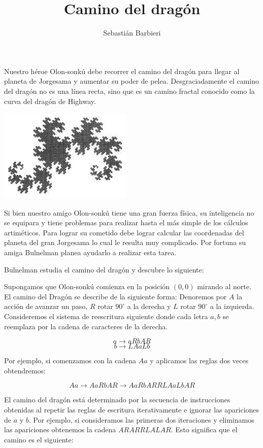 \documentclass{article}
\title{Camino del drag\'on}
\author{Sebasti\'an Barbieri}
\begin{document}
\begin{problemDescription}

Nuestro h\'eroe Olon-sonk\'u debe recorrer el camino del drag\'on para llegar al planeta de Jorgesama y aumentar su poder de pelea. Desgraciadamente el camino del drag\'on no es una l\'inea recta, sino que es un camino fractal conocido como la curva del drag\'on de Highway.
\begin{center}
	\includegraphics[scale=0.6]{dragon.png}
\end{center}

Si bien nuestro amigo Olon-sonk\'u tiene una gran fuerza f\'isica, su inteligencia no se equipara y tiene problemas para realizar hasta el m\'as simple de los c\'alculos artim\'eticos. Para lograr su cometido debe lograr calcular las coordenadas del planeta del gran Jorgesama lo cual le resulta muy complicado. Por fortuna su amiga Bulnelman planea ayudarlo a realizar esta tarea.

Bulnelman estudia el camino del drag\'on y descubre lo siguiente:

Supongamos que Olon-sonk\'u comienza en la posici\'on $(0,0)$ mirando al norte. El camino del Drag\'on se describe de la siguiente forma: Denoremos por $A$ la acci\'on de avanzar un paso, $R$ rotar $90^{\circ}$ a la derecha y $L$ rotar $90^{\circ}$ a la izquierda. Consideremos el sistema de reescritura siguiente donde cada letra $a,b$ se reemplaza por la cadena de caracteres de la derecha.

$$a \rightarrow aRbAR$$
$$b \rightarrow LAaLb$$

Por ejemplo, si comenzamos con la cadena $Aa$ y aplicamos las reglas dos veces obtendremos:

$$Aa \rightarrow AaRbAR \rightarrow AaRbARRLAaLbAR $$

El camino del drag\'on est\'a determinado por la secuencia de instrucciones obtenidas al repetir las reglas de escritura iterativamente e ignorar las apariciones de $a$ y $b$. Por ejemplo, si consideramos las primeras dos iteraciones y eliminamos las apariciones obtenemos la cadena $ARARRLALAR$. Esto significa que el camino es el siguiente:


\end{problemDescription}
\end{document}

